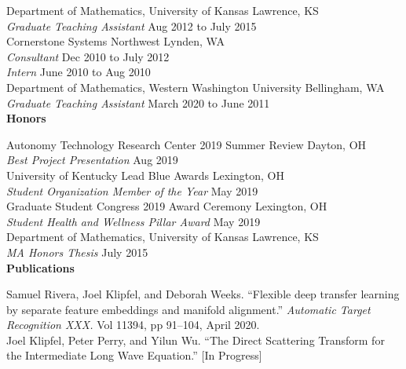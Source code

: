 \documentclass[dissertation.tex]{subfiles}
\begin{document}
\noi{}Department of Mathematics, University of Kansas \hfill Lawrence, KS \\
\noi{}\textit{Graduate Teaching Assistant} \hfill Aug 2012 to July 2015 \\

\noi{}Cornerstone Systems Northwest \hfill Lynden, WA \\
\noi{}\textit{Consultant} \hfill Dec 2010 to July 2012 \\
\noi{}\textit{Intern} \hfill June 2010 to Aug 2010 \\

\noi{}Department of Mathematics, Western Washington University \hfill Bellingham, WA \\
\noi{}\textit{Graduate Teaching Assistant} \hfill March 2020 to June 2011 \\

\noi\textbf{Honors}

\noi{}Autonomy Technology Research Center 2019 Summer Review \hfill Dayton, OH\\
\noi{}\textit{Best Project Presentation} \hfill Aug 2019 \\

\noi{}University of Kentucky Lead Blue Awards \hfill Lexington, OH\\
\noi{}\textit{Student Organization Member of the Year} \hfill May 2019 \\

\noi{}Graduate Student Congress 2019 Award Ceremony \hfill Lexington, OH\\
\noi{}\textit{Student Health and Wellness Pillar Award} \hfill May 2019 \\

\noi{}Department of Mathematics, University of Kansas \hfill Lawrence, KS\\
\noi{}\textit{MA Honors Thesis} \hfill July 2015 \\


\noi\textbf{Publications}

\noi{}Samuel Rivera, Joel Klipfel, and Deborah Weeks.
``Flexible deep transfer learning by separate feature embeddings and manifold 
alignment.'' \textit{Automatic Target Recognition XXX.} Vol 11394, pp 91--104, April 2020. \\

\noi{}Joel Klipfel, Peter Perry, and Yilun Wu. 
``The Direct Scattering Transform for the Intermediate Long Wave Equation.'' [In Progress]
\end{document}
